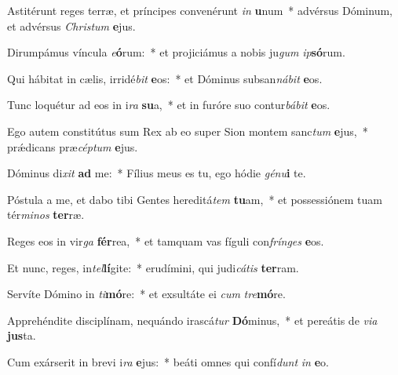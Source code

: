 \item Astitérunt reges terræ, et príncipes convenérunt \textit{in} \textbf{u}num~* advérsus Dóminum, et advérsus \textit{Chris}\textit{tum} \textbf{e}jus.
\item Dirumpámus víncula \textit{e}\textbf{ó}rum:~* et projiciámus a nobis ju\textit{gum} \textit{ip}\textbf{só}rum.
\item Qui hábitat in cælis, irridé\textit{bit} \textbf{e}os:~* et Dóminus subsan\textit{ná}\textit{bit} \textbf{e}os.
\item Tunc loquétur ad eos in i\textit{ra} \textbf{su}a,~* et in furóre suo contur\textit{bá}\textit{bit} \textbf{e}os.
\item Ego autem constitútus sum Rex ab eo super Sion montem sanc\textit{tum} \textbf{e}jus,~* prǽdicans præ\textit{cép}\textit{tum} \textbf{e}jus.
\item Dóminus di\textit{xit} \textbf{ad} me:~* Fílius meus es tu, ego hódie \textit{gé}\textit{nu}\textbf{i} te.
\item Póstula a me, et dabo tibi Gentes hereditá\textit{tem} \textbf{tu}am,~* et possessiónem tuam tér\textit{mi}\textit{nos} \textbf{ter}ræ.
\item Reges eos in vir\textit{ga} \textbf{fér}rea,~* et tamquam vas fíguli con\textit{frín}\textit{ges} \textbf{e}os.
\item Et nunc, reges, in\textit{tel}\textbf{lí}gite:~* erudímini, qui judi\textit{cá}\textit{tis} \textbf{ter}ram.
\item Servíte Dómino in \textit{ti}\textbf{mó}re:~* et exsultáte ei \textit{cum} \textit{tre}\textbf{mó}re.
\item Apprehéndite disciplínam, nequándo irascá\textit{tur} \textbf{Dó}minus,~* et pereátis de \textit{vi}\textit{a} \textbf{jus}ta.
\item Cum exárserit in brevi i\textit{ra} \textbf{e}jus:~* beáti omnes qui confí\textit{dunt} \textit{in} \textbf{e}o.
